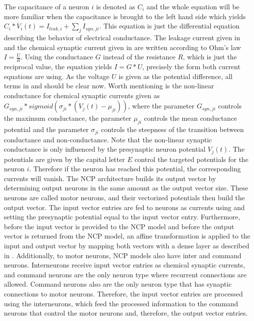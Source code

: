 \documentclass[draft,final]{vutinfth} %
\begin{document}
    The capacitance of a neuron $i$ is denoted as $C_i$ and the whole equation will be more familiar when the capacitance is brought to the left hand side which yields $C_i * \dot{V_i}(t) = I_{leak,i} + \sum_j{I_{syn,ji}}$.
    This equation is just the differential equation describing the behavior of electrical conductance.
    The leakage current given in  and the chemical synaptic current given in  are written according to Ohm's law $I = \frac{U}{R}$.
    Using the conductance $G$ instead of the resistance $R$, which is just the reciprocal value, the equation yields $I = G * U$, precisely the form both current equations are using.
    As the voltage $U$ is given as the potential difference, all terms in  and  should be clear now.
    Worth mentioning is the non-linear conductance for chemical synaptic currents given as $G_{syn,ji} * sigmoid(\sigma_{ji}*(V_j(t)-\mu_{ji}))$, where the parameter $G_{syn,ji}$ controls the maximum conductance, the parameter $\mu_{ji}$ controls the mean conductance potential and the parameter $\sigma_{ji}$ controls the steepness of the transition between conductance and non-conductance.
    Note that the non-linear synaptic conductance is only influenced by the presynaptic neuron potential $V_j(t)$.
    The potentials are given by the capital letter $E$ control the targeted potentials for the neuron $i$. Therefore if the neuron has reached this potential, the corresponding currents will vanish.
    The NCP architecture builds its output vector by determining output neurons in the same amount as the output vector size.
    These neurons are called motor neurons, and their vectorized potentials then build the output vector.
    The input vector entries are fed to neurons as currents using  and setting the presynaptic potential equal to the input vector entry.
    Furthermore, before the input vector is provided to the NCP model and before the output vector is returned from the NCP model, an affine transformation is applied to the input and output vector by mapping both vectors with a dense layer as described in .
    Additionally, to motor neurons, NCP models also have inter and command neurons.
    Interneurons receive input vector entries as chemical synaptic currents, and command neurons are the only neuron type where recurrent connections are allowed.
    Command neurons also are the only neuron type that has synaptic connections to motor neurons.
    Therefore, the input vector entries are processed using the interneurons, which feed the processed information to the command neurons that control the motor neurons and, therefore, the output vector entries.
\end{document}
